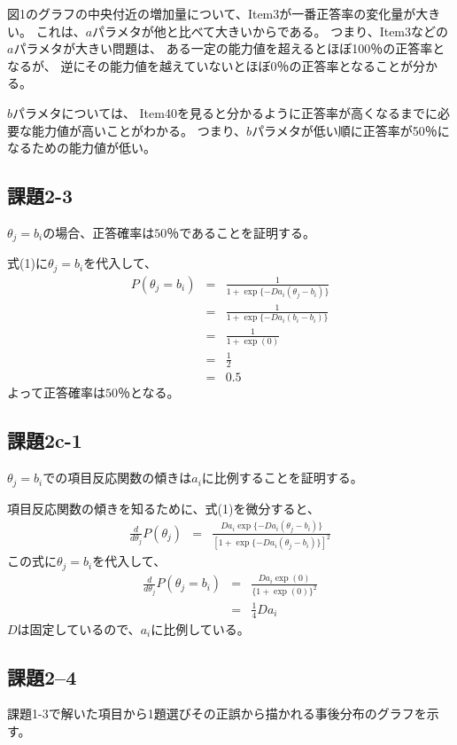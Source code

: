 \documentclass[12pt]{jarticle}
\begin{document}
図1のグラフの中央付近の増加量について、Item3が一番正答率の変化量が大きい。
これは、$a$パラメタが他と比べて大きいからである。
つまり、Item3などの$a$パラメタが大きい問題は、
ある一定の能力値を超えるとほぼ100％の正答率となるが、
逆にその能力値を越えていないとほぼ0％の正答率となることが分かる。

$b$パラメタについては、
Item40を見ると分かるように正答率が高くなるまでに必要な能力値が高いことがわかる。
つまり、$b$パラメタが低い順に正答率が50％になるための能力値が低い。

\subsection{課題2-3}
\begin{shadebox}
    $\theta_j=b_i$の場合、正答確率は$50％$であることを証明する。
\end{shadebox}

式(1)に$\theta_j=b_i$を代入して、
\begin{eqnarray*}
    P(\theta_j=b_i)&=&\frac{1}{1+\exp\{-Da_i(\theta_j -b_i)\}}\\
    &=&\frac{1}{1+\exp\{-Da_i(b_i -b_i)\}}\\
    &=&\frac{1}{1+\exp(0)}\\
    &=&\frac{1}{2}\\
    &=&0.5
\end{eqnarray*}
よって正答確率は$50％$となる。

\subsection{課題2c-1}
\begin{shadebox}
    $\theta_j=b_i$での項目反応関数の傾きは$a_i$に比例することを証明する。
\end{shadebox}

項目反応関数の傾きを知るために、式(1)を微分すると、
\begin{eqnarray*}
    \frac{d}{d \theta_j}P(\theta_j)&=& \frac{Da_i\exp\{-Da_i(\theta_j -b_i)\}}{[1+\exp\{-Da_i(\theta_j -b_i)\}]^2}
\end{eqnarray*}
この式に$\theta_j=b_i$を代入して、
\begin{eqnarray*}
    \frac{d}{d \theta_j}P(\theta_j=b_i)&=& \frac{Da_i\exp(0)}{\{1+\exp(0)\}^2}\\
    &=&\frac{1}{4}Da_i
\end{eqnarray*}
$D$は固定しているので、$a_i$に比例している。

\clearpage
\subsection{課題2–4}
\begin{shadebox}
    課題1-3で解いた項目から1題選びその正誤から描かれる事後分布のグラフを示す。
\end{shadebox}
\end{document}
